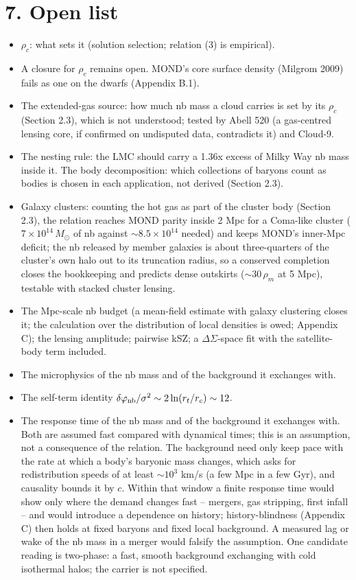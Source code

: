 \documentclass[
  10pt,
]{article}
\begin{document}
\section{7. Open list}\label{open-list}
\begin{itemize}
\item $\rho_c$: what sets it (solution selection; relation (3) is empirical).
\item A closure for $\rho_c$ remains open. MOND's core surface density (Milgrom 2009) fails as one on the dwarfs (Appendix B.1).
\item The extended-gas source: how much nb mass a cloud carries is set by its $\rho_c$ (Section 2.3), which is not understood; tested by Abell 520 (a gas-centred lensing core, if confirmed on undisputed data, contradicts it) and Cloud-9.
\item The nesting rule: the LMC should carry a 1.36x excess of Milky Way nb mass inside it. The body decomposition: which collections of baryons count as bodies is chosen in each application, not derived (Section 2.3).
\item Galaxy clusters: counting the hot gas as part of the cluster body (Section 2.3), the relation reaches MOND parity inside 2 Mpc for a Coma-like cluster ($7\times10^{14}\,M_\odot$ of nb against $\sim8.5\times10^{14}$ needed) and keeps MOND's inner-Mpc deficit; the nb released by member galaxies is about three-quarters of the cluster's own halo out to its truncation radius, so a conserved completion closes the bookkeeping and predicts dense outskirts ($\sim30\,\rho_m$ at 5 Mpc), testable with stacked cluster lensing.
\item The Mpc-scale nb budget (a mean-field estimate with galaxy clustering closes it; the calculation over the distribution of local densities is owed; Appendix C); the lensing amplitude; pairwise kSZ; a $\Delta\Sigma$-space fit with the satellite-body term included.
\item The microphysics of the nb mass and of the background it exchanges with.
\item The self-term identity $\delta\varphi_{\rm nb}/\sigma^2\sim 2\ln(r_t/r_c)\sim 12$.
\item The response time of the nb mass and of the background it exchanges with. Both are assumed fast compared with dynamical times; this is an assumption, not a consequence of the relation. The background need only keep pace with the rate at which a body's baryonic mass changes, which asks for redistribution speeds of at least $\sim10^3$ km/s (a few Mpc in a few Gyr), and causality bounds it by $c$. Within that window a finite response time would show only where the demand changes fast -- mergers, gas stripping, first infall -- and would introduce a dependence on history; history-blindness (Appendix C) then holds at fixed baryons and fixed local background. A measured lag or wake of the nb mass in a merger would falsify the assumption. One candidate reading is two-phase: a fast, smooth background exchanging with cold isothermal halos; the carrier is not specified.

\end{itemize}
\end{document}
